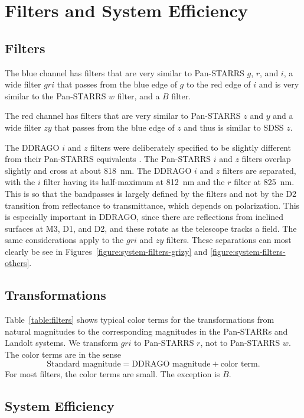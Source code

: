 \chapter{Filters and System Efficiency}

\section{Filters}

The blue channel has filters that are very similar to Pan-STARRS $g$, $r$, and $i$, a wide filter $gri$ that passes from the blue edge of $g$ to the red edge of $i$ and is very similar to the Pan-STARRS $w$ filter, and a $B$ filter.

The red channel has filters that are very similar to Pan-STARRS $z$ and $y$ and a wide filter $zy$ that passes from the blue edge of $z$ and thus is similar to SDSS $z$.

The DDRAGO $i$ and $z$ filters were deliberately specified to be slightly different from their Pan-STARRS equivalents \citep{Tonry-2012}. The Pan-STARRS $i$ and $z$ filters overlap slightly and cross at about 818~nm. The DDRAGO $i$ and $z$ filters are separated, with the $i$ filter having its half-maximum at 812~nm and the $r$ filter at 825~nm. This is so that the bandpasses is largely defined by the filters and not by the D2 transition from reflectance to transmittance, which depends on polarization. This is especially important in DDRAGO, since there are reflections from inclined surfaces at M3, D1, and D2, and these rotate as the telescope tracks a field. The same considerations apply to the $gri$ and $zy$ filters. These separations can most clearly be see in Figures~\ref{figure:system-filters-grizy} and \ref{figure:system-filters-others}.


\section{Transformations}

Table~\ref{table:filters} shows typical color terms for the transformations from natural magnitudes to the corresponding magnitudes in the Pan-STARRs and Landolt systems. We transform $gri$ to Pan-STARRS $r$, not to Pan-STARRS $w$. The color terms are in the sense
$$
\mbox{Standard magnitude} = \mbox{DDRAGO magnitude} + \mbox{color term}.
$$
For most filters, the color terms are small. The exception is $B$.

\section{System Efficiency}

